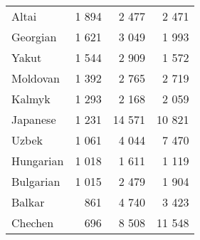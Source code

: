 \begin{table}[t]
\begin{tabular}{lrrr}
Altai & 1 894 & 2 477 & 2 471\\
Georgian & 1 621 & 3 049 & 1 993\\
Yakut & 1 544 & 2 909 & 1 572\\
Moldovan & 1 392 & 2 765 & 2 719\\
Kalmyk & 1 293 & 2 168 & 2 059\\
Japanese & 1 231 & 14 571 & 10 821\\
Uzbek & 1 061 & 4 044 & 7 470\\
Hungarian & 1 018 & 1 611 & 1 119\\
Bulgarian & 1 015 & 2 479 & 1 904\\
Balkar & 861 & 4 740 & 3 423\\
Chechen & 696 & 8 508 & 11 548\\
\bottomrule
\end{tabular}
\end{table}